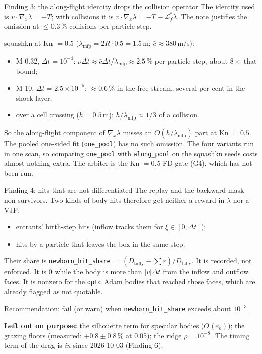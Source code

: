 \documentclass[10pt,aspectratio=169]{beamer}
\newcommand{\code}[1]{\texttt{\small #1}}
\begin{document}
\begin{frame}{Finding 3: the along-flight identity drops the collision operator}
The identity used is $v\cdot\nabla_x\lambda = -T$; with collisions it is
$v\cdot\nabla_x\lambda = -T - \mathcal L^*_f\lambda$.  The note justifies the omission at
$\le 0.3\,\%$ collisions per particle-step.

\medskip
squashkn at Kn $= 0.5$ ($\lambda_{\mathrm{mfp}} = 2R\cdot0.5 = 1.5$\,m; $\bar c\approx380$\,m/s):
\begin{itemize}
\item M 0.32, $\Delta t = 10^{-4}$: $\nu\Delta t\approx \bar c\Delta t/\lambda_{\mathrm{mfp}} \approx 2.5\,\%$ per
  particle-step, about $8\times$ that bound;
\item M 10, $\Delta t = 2.5\times10^{-5}$: $\approx0.6\,\%$ in the free stream, several per cent in the shock
  layer;
\item over a cell crossing ($h = 0.5$\,m): $h/\lambda_{\mathrm{mfp}}\approx 1/3$ of a collision.
\end{itemize}
So the along-flight component of $\nabla_x\lambda$ misses an $O(h/\lambda_{\mathrm{mfp}})$ part at Kn $= 0.5$.
The pooled one-sided fit (\code{one\_pool}) has no such omission.  The four variants run in
one scan, so comparing \code{one\_pool} with \code{along\_pool} on the squashkn seeds costs
almost nothing extra.  The arbiter is the Kn $= 0.5$ FD gate (G4), which has not been run.
\end{frame}

\begin{frame}{Finding 4: hits that are not differentiated}
The replay and the backward mask non-survivors.  Two kinds of body hits therefore get
neither a reward in $\lambda$ nor a VJP:
\begin{itemize}
\item entrants' birth-step hits (inflow tracks them for $\xi\in[0,\Delta t]$);
\item hits by a particle that leaves the box in the same step.
\end{itemize}
Their share is \code{newborn\_hit\_share} $=(D_{\mathrm{tally}} - \sum r)/D_{\mathrm{tally}}$.  It is
recorded, not enforced.  It is $0$ while the body is more than $|v|\Delta t$ from the inflow and
outflow faces.  It is nonzero for the \code{optc} Adam bodies that reached those faces, which
are already flagged as not quotable.

\medskip
Recommendation: fail (or warn) when \code{newborn\_hit\_share} exceeds about $10^{-3}$.

\bigskip
\textbf{Left out on purpose:} the silhouette term for specular bodies ($O(\varepsilon_b)$);
the grazing floors (measured: $+0.8\pm0.8\,\%$ at 0.05); the ridge $\rho = 10^{-8}$.  The
timing term of the drag is \emph{in} since 2026-10-03 (Finding 6).
\end{frame}
\end{document}
